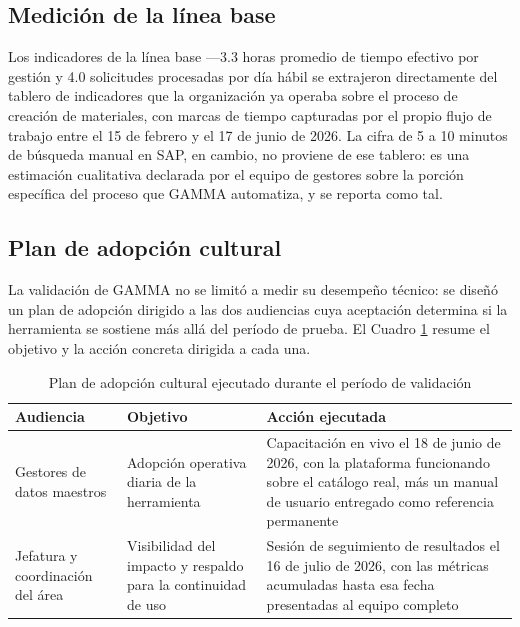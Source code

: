 \subsection{Medición de la línea base}
Los indicadores de la línea base —3.3 horas promedio de tiempo efectivo por gestión y 4.0 solicitudes procesadas por día hábil se extrajeron directamente del tablero de indicadores que la organización ya operaba sobre el proceso de creación de materiales, con marcas de tiempo capturadas por el propio flujo de trabajo entre el 15 de febrero y el 17 de junio de 2026. La cifra de 5 a 10 minutos de búsqueda manual en SAP, en cambio, no proviene de ese tablero: es una estimación cualitativa declarada por el equipo de gestores sobre la porción específica del proceso que GAMMA automatiza, y se reporta como tal.


\subsection{Plan de adopción cultural}
La validación de GAMMA no se limitó a medir su desempeño técnico: se diseñó un plan de adopción dirigido a las dos audiencias cuya aceptación determina si la herramienta se sostiene más allá del período de prueba. El Cuadro \ref{tab:plan-cultural} resume el objetivo y la acción concreta dirigida a cada una.

\begin{table}[!htb]
\centering
\caption{Plan de adopción cultural ejecutado durante el período de validación}
\label{tab:plan-cultural}
\small
\begin{tabular}{p{2.8cm}p{4.5cm}p{5.5cm}}
\toprule
\textbf{Audiencia} & \textbf{Objetivo} & \textbf{Acción ejecutada} \\
\midrule
Gestores de datos maestros & Adopción operativa diaria de la herramienta & Capacitación en vivo el 18 de junio de 2026, con la plataforma funcionando sobre el catálogo real, más un manual de usuario entregado como referencia permanente \\
\addlinespace
Jefatura y coordinación del área & Visibilidad del impacto y respaldo para la continuidad de uso & Sesión de seguimiento de resultados el 16 de julio de 2026, con las métricas acumuladas hasta esa fecha presentadas al equipo completo \\
\bottomrule
\end{tabular}
\end{table}

